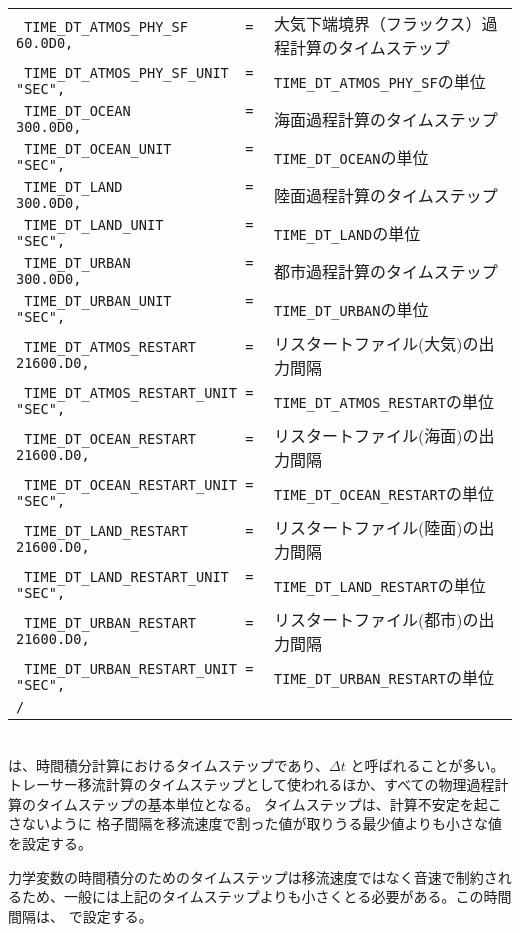 {{{\begin{tabularx}{150mm}{lX}
\verb| TIME_DT_ATMOS_PHY_SF       = 60.0D0, | & 大気下端境界（フラックス）過程計算のタイムステップ\\
\verb| TIME_DT_ATMOS_PHY_SF_UNIT  = "SEC",  | & \verb|TIME_DT_ATMOS_PHY_SF|の単位\\
\verb| TIME_DT_OCEAN              = 300.0D0,| & 海面過程計算のタイムステップ\\
\verb| TIME_DT_OCEAN_UNIT         = "SEC",  | & \verb|TIME_DT_OCEAN|の単位\\
\verb| TIME_DT_LAND               = 300.0D0,| & 陸面過程計算のタイムステップ\\
\verb| TIME_DT_LAND_UNIT          = "SEC",  | & \verb|TIME_DT_LAND|の単位\\
\verb| TIME_DT_URBAN              = 300.0D0,| & 都市過程計算のタイムステップ\\
\verb| TIME_DT_URBAN_UNIT         = "SEC",  | & \verb|TIME_DT_URBAN|の単位\\
\verb| TIME_DT_ATMOS_RESTART      = 21600.D0, | & リスタートファイル(大気)の出力間隔\\
\verb| TIME_DT_ATMOS_RESTART_UNIT = "SEC",    | & \verb|TIME_DT_ATMOS_RESTART|の単位\\
\verb| TIME_DT_OCEAN_RESTART      = 21600.D0, | & リスタートファイル(海面)の出力間隔\\
\verb| TIME_DT_OCEAN_RESTART_UNIT = "SEC",    | & \verb|TIME_DT_OCEAN_RESTART|の単位\\
\verb| TIME_DT_LAND_RESTART       = 21600.D0, | & リスタートファイル(陸面)の出力間隔\\
\verb| TIME_DT_LAND_RESTART_UNIT  = "SEC",    | & \verb|TIME_DT_LAND_RESTART|の単位\\
\verb| TIME_DT_URBAN_RESTART      = 21600.D0, | & リスタートファイル(都市)の出力間隔\\
\verb| TIME_DT_URBAN_RESTART_UNIT = "SEC",    | & \verb|TIME_DT_URBAN_RESTART|の単位\\
\verb|/|\\
\end{tabularx}
}}}\\


 は、時間積分計算におけるタイムステップであり、$\Delta t$ と呼ばれることが多い。
トレーサー移流計算のタイムステップとして使われるほか、すべての物理過程計算のタイムステップの基本単位となる。
タイムステップは、計算不安定を起こさないように
格子間隔を移流速度で割った値が取りうる最少値よりも小さな値を設定する。

力学変数の時間積分のためのタイムステップは移流速度ではなく音速で制約されるため、一般には上記のタイムステップよりも小さくとる必要がある。この時間間隔は、 で設定する。

